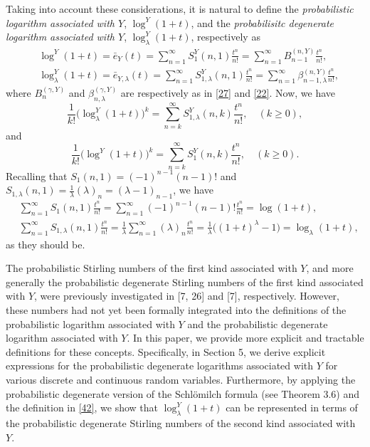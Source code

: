 \documentclass[a4paper,11pt]{amsart}
\begin{document}
Taking into account these considerations, it is natural to define the {\it{probabilistic logarithm associated with $Y$}}, $\log^{Y}(1+t)$, and the {\it{probabilisitc degenerate logarithm associated with $Y$}}, $\log_{\lambda}^{Y}(1+t)$, respectively as
\begin{equation}\label{42}
\begin{aligned}
&\log^{Y}(1+t)=\bar{e}_{Y}(t)=\sum_{n=1}^{\infty}S_{1}^{Y}(n,1)\frac{t^{n}}{n!}=\sum_{n=1}^{\infty}B_{n-1}^{(n,Y)}\frac{t^{n}}{n!}, \\
&\log_{\lambda}^{Y}(1+t)=\bar{e}_{Y,\lambda}(t)=\sum_{n=1}^{\infty}S_{1,\lambda}^{Y}(n,1)\frac{t^{n}}{n!}=\sum_{n=1}^{\infty}\beta_{n-1,\lambda}^{(n,Y)}\frac{t^{n}}{n!},
\end{aligned} 
\end{equation}
where $B_{n}^{(\gamma,Y)}$ and $\beta_{n,\lambda}^{(\gamma,Y)}$ are respectively as in \eqref{27} and \eqref{22}.
Now, we have
\begin{equation*}
\frac{1}{k!}\big(\log_{\lambda}^{Y}(1+t)\big)^{k}=\sum_{n=k}^{\infty}S_{1,\lambda}^{Y}(n,k)\frac{t^{n}}{n!},\quad (k \ge 0),
\end{equation*}
and
\begin{equation*}
\frac{1}{k!}\big(\log^{Y}(1+t)\big)^{k}=\sum_{n=k}^{\infty}S_{1}^{Y}(n,k)\frac{t^{n}}{n!},\quad (k \ge 0).
\end{equation*}
Recalling that $S_{1}(n,1)=(-1)^{n-1}(n-1)!$ and $S_{1,\lambda}(n,1)=\frac{1}{\lambda}(\lambda)_{n}=(\lambda-1)_{n-1}$, we have
\begin{align*}
&\sum_{n=1}^{\infty}S_{1}(n,1)\frac{t^{n}}{n!}=\sum_{n=1}^{\infty}(-1)^{n-1}(n-1)!\frac{t^{n}}{n!}=\log(1+t), \\
&\sum_{n=1}^{\infty}S_{1,\lambda}(n,1)\frac{t^{n}}{n!}=\frac{1}{\lambda}\sum_{n=1}^{\infty}(\lambda)_{n}\frac{t^{n}}{n!}=\frac{1}{\lambda}\big((1+t)^{\lambda}-1\big)=\log_{\lambda}(1+t),
\end{align*}
as they should be. \par

The probabilistic Stirling numbers of the first kind associated with $Y$, and more generally the probabilistic degenerate Stirling numbers of the first kind associated with $Y$, were previously investigated in [7, 26] and [7], respectively. However, these numbers had not yet been formally integrated into the definitions of the probabilistic logarithm associated with $Y$ and the probabilistic degenerate logarithm associated with $Y$. In this paper, we provide more explicit and tractable definitions for these concepts. Specifically, in Section 5, we derive explicit expressions for the probabilistic degenerate logarithms associated with $Y$ for various discrete and continuous random variables. Furthermore, by applying the probabilistic degenerate version of the Schlömilch formula (see Theorem 3.6) and the definition in \eqref{42}, we show that $\log_{\lambda}^{Y}(1+t)$ can be represented in terms of the probabilistic degenerate Stirling numbers of the second kind associated with $Y$.
\end{document}
